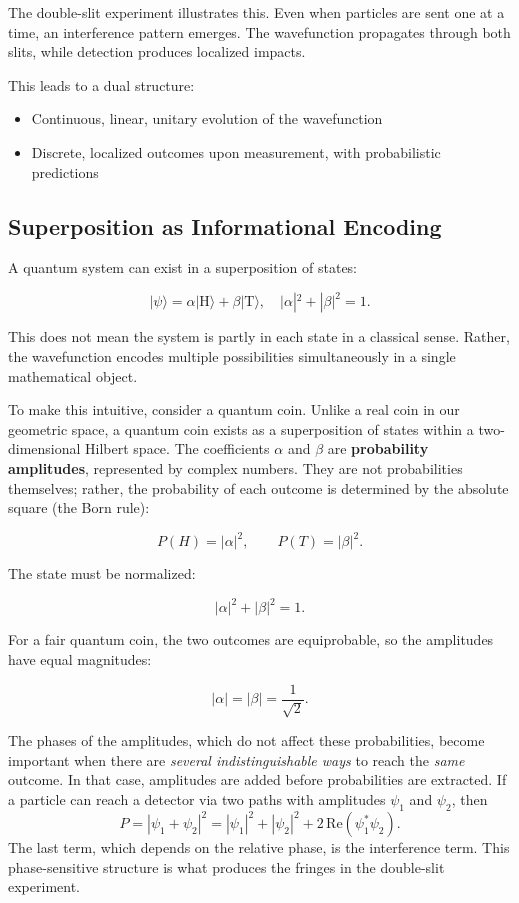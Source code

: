 The double-slit experiment illustrates this.
Even when particles are sent one at a time, an interference pattern emerges.
The wavefunction propagates through both slits, while detection produces localized impacts.

This leads to a dual structure:

\begin{itemize}
\item Continuous, linear, unitary evolution of the wavefunction
\item Discrete, localized outcomes upon measurement, with probabilistic predictions
\end{itemize}


\subsection*{Superposition as Informational Encoding}

A quantum system can exist in a superposition of states:

\[
|\psi\rangle = \alpha |\text{H}\rangle + \beta |\text{T}\rangle,
\quad
|\alpha|^2 + |\beta|^2 = 1.
\]

This does not mean the system is partly in each state in a classical sense. Rather, the wavefunction encodes multiple possibilities simultaneously in a single mathematical object.

To make this intuitive, consider a quantum coin. Unlike a real coin in our geometric space, a quantum coin exists as a superposition of states
within a two-dimensional Hilbert space. 
The coefficients $\alpha$ and $\beta$ are \textbf{probability amplitudes},
represented by complex numbers. They are not probabilities themselves;
rather, the probability of each outcome is determined by the absolute
square (the Born rule):

\[
P(H)=|\alpha|^2,\qquad P(T)=|\beta|^2.
\]

The state must be normalized:

\[
|\alpha|^2 + |\beta|^2 = 1.
\]

For a fair quantum coin, the two outcomes are equiprobable, so the
amplitudes have equal magnitudes:

\[
|\alpha|=|\beta|=\frac{1}{\sqrt{2}}.
\]

The phases of the amplitudes, which do not affect these probabilities, become important when there are \emph{several indistinguishable ways} to reach the \emph{same} outcome. In that case, amplitudes are added before probabilities are extracted. If a particle can reach a detector via two paths with amplitudes $\psi_1$ and $\psi_2$, then
\[
P = |\psi_1 + \psi_2|^2 = |\psi_1|^2 + |\psi_2|^2 + 2\,\mathrm{Re}(\psi_1^*\psi_2).
\]
The last term, which depends on the relative phase, is the interference term. This phase-sensitive structure is what produces the fringes in the double-slit experiment.



